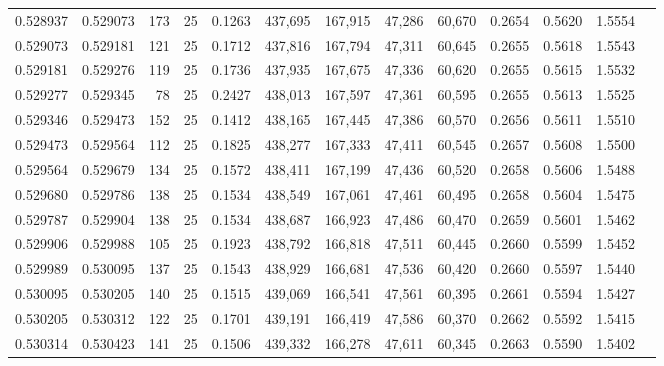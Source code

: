 \begin{tabular}{rrrrrrrrrrrrr}
0.528937 & 0.529073 &   173 &  25 &                                     0.1263 & 437,695 & 167,915 &  47,286 &  60,670 & 0.2654 & 0.5620 & 1.5554 \\
0.529073 & 0.529181 &   121 &  25 &                                     0.1712 & 437,816 & 167,794 &  47,311 &  60,645 & 0.2655 & 0.5618 & 1.5543 \\
0.529181 & 0.529276 &   119 &  25 &                                     0.1736 & 437,935 & 167,675 &  47,336 &  60,620 & 0.2655 & 0.5615 & 1.5532 \\
0.529277 & 0.529345 &    78 &  25 &                                     0.2427 & 438,013 & 167,597 &  47,361 &  60,595 & 0.2655 & 0.5613 & 1.5525 \\
0.529346 & 0.529473 &   152 &  25 &                                     0.1412 & 438,165 & 167,445 &  47,386 &  60,570 & 0.2656 & 0.5611 & 1.5510 \\
0.529473 & 0.529564 &   112 &  25 &                                     0.1825 & 438,277 & 167,333 &  47,411 &  60,545 & 0.2657 & 0.5608 & 1.5500 \\
0.529564 & 0.529679 &   134 &  25 &                                     0.1572 & 438,411 & 167,199 &  47,436 &  60,520 & 0.2658 & 0.5606 & 1.5488 \\
0.529680 & 0.529786 &   138 &  25 &                                     0.1534 & 438,549 & 167,061 &  47,461 &  60,495 & 0.2658 & 0.5604 & 1.5475 \\
0.529787 & 0.529904 &   138 &  25 &                                     0.1534 & 438,687 & 166,923 &  47,486 &  60,470 & 0.2659 & 0.5601 & 1.5462 \\
0.529906 & 0.529988 &   105 &  25 &                                     0.1923 & 438,792 & 166,818 &  47,511 &  60,445 & 0.2660 & 0.5599 & 1.5452 \\
0.529989 & 0.530095 &   137 &  25 &                                     0.1543 & 438,929 & 166,681 &  47,536 &  60,420 & 0.2660 & 0.5597 & 1.5440 \\
0.530095 & 0.530205 &   140 &  25 &                                     0.1515 & 439,069 & 166,541 &  47,561 &  60,395 & 0.2661 & 0.5594 & 1.5427 \\
0.530205 & 0.530312 &   122 &  25 &                                     0.1701 & 439,191 & 166,419 &  47,586 &  60,370 & 0.2662 & 0.5592 & 1.5415 \\
0.530314 & 0.530423 &   141 &  25 &                                     0.1506 & 439,332 & 166,278 &  47,611 &  60,345 & 0.2663 & 0.5590 & 1.5402 \\

\end{tabular}
